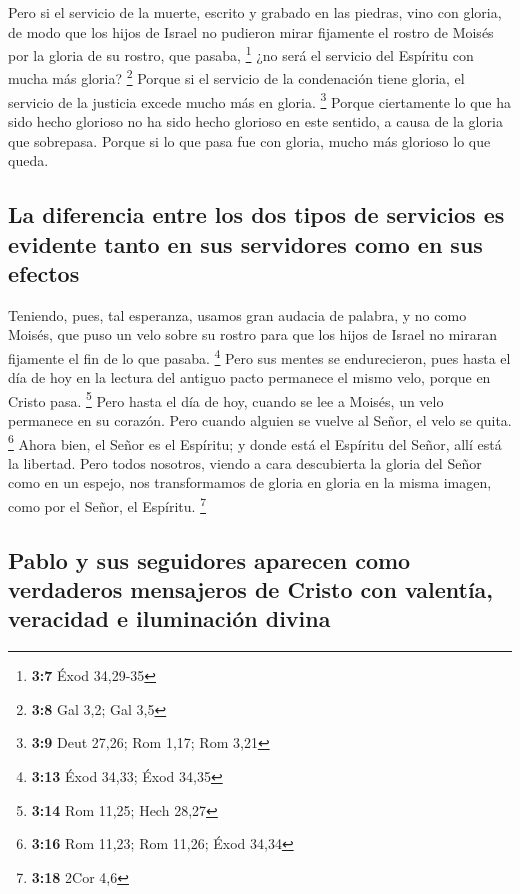  Pero si el servicio de la muerte, escrito y grabado en
las piedras, vino con gloria, de modo que los hijos de Israel no
pudieron mirar fijamente el rostro de Moisés por la gloria de su rostro,
que pasaba, \footnote{\textbf{3:7} Éxod 34,29-35}  ¿no
será el servicio del Espíritu con mucha más gloria? \footnote{\textbf{3:8}
  Gal 3,2; Gal 3,5}  Porque si el servicio de la
condenación tiene gloria, el servicio de la justicia excede mucho más en
gloria. \footnote{\textbf{3:9} Deut 27,26; Rom 1,17; Rom 3,21}
 Porque ciertamente lo que ha sido hecho glorioso no ha
sido hecho glorioso en este sentido, a causa de la gloria que sobrepasa.
 Porque si lo que pasa fue con gloria, mucho más glorioso
lo que queda.

\hypertarget{la-diferencia-entre-los-dos-tipos-de-servicios-es-evidente-tanto-en-sus-servidores-como-en-sus-efectos}{%
\subsection{La diferencia entre los dos tipos de servicios es evidente
tanto en sus servidores como en sus
efectos}\label{la-diferencia-entre-los-dos-tipos-de-servicios-es-evidente-tanto-en-sus-servidores-como-en-sus-efectos}}

 Teniendo, pues, tal esperanza, usamos gran audacia de
palabra,  y no como Moisés, que puso un velo sobre su
rostro para que los hijos de Israel no miraran fijamente el fin de lo
que pasaba. \footnote{\textbf{3:13} Éxod 34,33; Éxod 34,35}
 Pero sus mentes se endurecieron, pues hasta el día de
hoy en la lectura del antiguo pacto permanece el mismo velo, porque en
Cristo pasa. \footnote{\textbf{3:14} Rom 11,25; Hech 28,27}
 Pero hasta el día de hoy, cuando se lee a Moisés, un
velo permanece en su corazón.  Pero cuando alguien se
vuelve al Señor, el velo se quita. \footnote{\textbf{3:16} Rom 11,23;
  Rom 11,26; Éxod 34,34}  Ahora bien, el Señor es el
Espíritu; y donde está el Espíritu del Señor, allí está la libertad.
 Pero todos nosotros, viendo a cara descubierta la gloria
del Señor como en un espejo, nos transformamos de gloria en gloria en la
misma imagen, como por el Señor, el Espíritu. \footnote{\textbf{3:18}
  2Cor 4,6}

\hypertarget{pablo-y-sus-seguidores-aparecen-como-verdaderos-mensajeros-de-cristo-con-valentuxeda-veracidad-e-iluminaciuxf3n-divina}{%
\subsection{Pablo y sus seguidores aparecen como verdaderos mensajeros
de Cristo con valentía, veracidad e iluminación
divina}\label{pablo-y-sus-seguidores-aparecen-como-verdaderos-mensajeros-de-cristo-con-valentuxeda-veracidad-e-iluminaciuxf3n-divina}}

